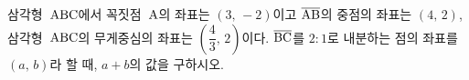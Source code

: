 삼각형~$\mathrm{ABC}$에서 꼭짓점~$\mathrm{A}$의 좌표는 $(3,\,-2)$이고 $\overline{\mathrm{AB}}$의 중점의 좌표는 $(4,\,2)$, 삼각형~$\mathrm{ABC}$의 무게중심의 좌표는 $\left(\dfrac{4}{3},\,2\right)$이다. $\overline{\mathrm{BC}}$를 $2:1$로 내분하는 점의 좌표를 $(a,\,b)$라 할 때, $a+b$의 값을 구하시오.
